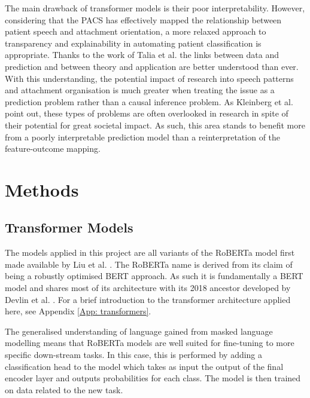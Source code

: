 \documentclass[12pt]{report}
\begin{document}
The main drawback of transformer models is their poor interpretability.
However, considering that the PACS has effectively mapped the relationship between patient speech and attachment orientation, a more relaxed approach to transparency and explainability in automating patient classification is appropriate.
Thanks to the work of Talia et al. \citeyear{Talia2017, Talia2014} the links between data and prediction and between theory and application are better understood than ever.
With this understanding, the potential impact of research into speech patterns and attachment organisation is much greater when treating the issue as a prediction problem rather than a causal inference problem.
As Kleinberg et al. \citeyear{PredictionPolicyProblems} point out, these types of problems are often overlooked in research in spite of their potential for great societal impact.
As such, this area stands to benefit more from a poorly interpretable prediction model than a reinterpretation of the feature-outcome mapping.

\section{Methods}

\subsection{Transformer Models}
The models applied in this project are all variants of the RoBERTa model first made available by Liu et al. \citeyear{roberta}.
The RoBERTa name is derived from its claim of being a robustly optimised BERT approach.
As such it is fundamentally a BERT model and shares most of its architecture with its 2018 ancestor developed by Devlin et al. \citeyear{BERT}.
For a brief introduction to the transformer architecture applied here, see Appendix \ref{App: transformers}.

The generalised understanding of language gained from masked language modelling means that RoBERTa models are well suited for fine-tuning to more specific down-stream tasks.
In this case, this is performed by adding a classification head to the model which takes as input the output of the final encoder layer and outputs probabilities for each class.
The model is then trained on data related to the new task.
\end{document}
